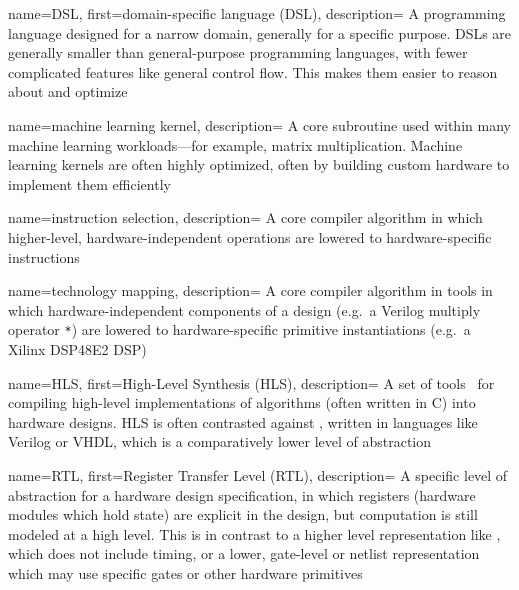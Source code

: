 
{
    name={DSL},
    first={domain-specific language (DSL)},
    description={
A programming language designed for a narrow domain, generally for a specific purpose.
DSLs are generally smaller
  than general-purpose programming languages,
  with fewer complicated features
  like general control flow.
This makes them easier to reason about
  and optimize}
}

{
    name={machine learning kernel},
    description={
A core subroutine used within many machine learning workloads---for example,
  matrix multiplication.
Machine learning kernels are often highly optimized,
  often by building custom hardware to implement
  them efficiently}
}

{
    name={instruction selection},
    description={
A core compiler algorithm
  in which higher-level,
  hardware-independent operations
  are lowered to
  hardware-specific instructions~\cite{blindell2016instruction}}
}

{
    name={technology mapping},
    description={
A core compiler algorithm
  in  tools
  in which
  hardware-independent components of a design
  (e.g.~a Verilog multiply operator \texttt{*})
  are lowered to
  hardware-specific primitive instantiations
  (e.g.~a Xilinx DSP48E2 DSP)}
}

{
    name={HLS},
    first={High-Level Synthesis (HLS)},
    description={
A set of tools~\cite{cong2011high}
  for compiling high-level implementations of algorithms
  (often written in C)
  into hardware designs.
HLS is often contrasted against
  ,
  written in languages like Verilog or VHDL,
  which is a comparatively lower level
  of abstraction}
}

{
    name={RTL},
    first={Register Transfer Level (RTL)},
    description={
A specific level of abstraction for a hardware design specification,
  in which registers (hardware modules which hold state)
  are explicit in the design,
  but computation is still modeled at a high level.
This is in contrast to a higher level representation
  like , which does not include timing,
  or a lower, gate-level or netlist representation
  which may use specific gates or other hardware primitives}
}

